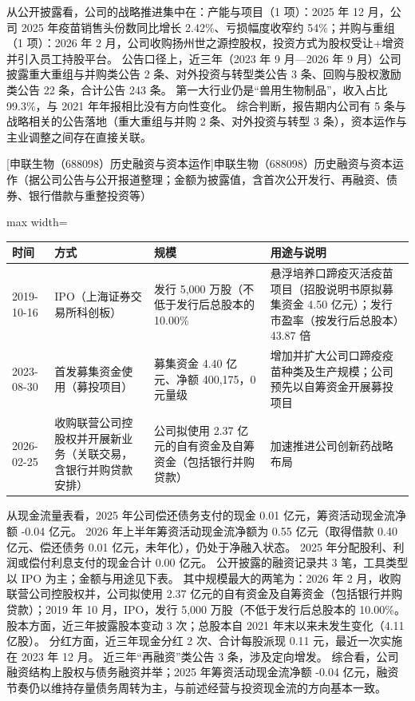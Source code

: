  从公开披露看，公司的战略推进集中在：产能与项目（1 项）：2025 年 12 月，公司 2025 年疫苗销售头份数同比增长 2.42\%、亏损幅度收窄约 54\%；并购与重组（1 项）：2026 年 2 月，公司收购扬州世之源控股权，投资方式为股权受让+增资并引入员工持股平台。 公告口径上，近三年（2023 年 9 月---2026 年 9 月）公司披露重大重组与并购类公告 2 条、对外投资与转型类公告 3 条、回购与股权激励类公告 22 条，合计公告 243 条。 第一大行业仍是“兽用生物制品”，收入占比 99.3\%，与 2021 年年报相比没有方向性变化。 综合判断，报告期内公司有 5 条与战略相关的公告落地（重大重组与并购 2 条、对外投资与转型 3 条），资本运作与主业调整之间存在直接关联。

\begin{center}\small\setlength{\tabcolsep}{4pt}
[申联生物（688098）历史融资与资本运作]{申联生物（688098）历史融资与资本运作（据公司公告与公开报道整理；金额为披露值，含首次公开发行、再融资、债券、银行借款与重整投资等）}
\begin{adjustbox}{max width=\textwidth}
\begin{tabular}{@{}p{1.45cm}p{2.55cm}p{4.05cm}p{4.95cm}@{}}
\toprule
时间 & 方式 & 规模 & 用途与说明 \\
\midrule
2019-10-16 & IPO（上海证券交易所科创板） & 发行 5,\allowbreak{}000 万股（不低于发行后总股本的 10.00\% & 悬浮培养口蹄疫灭活疫苗项目（招股说明书原拟募集资金 4.50 亿元）；发行市盈率（按发行后总股本）43.87 倍 \\
2023-08-30 & 首发募集资金使用（募投项目） & 募集资金 4.40 亿元、\allowbreak{}净额 400,\allowbreak{}175，\allowbreak{}0 元量级 & 增加并扩大公司口蹄疫疫苗种类及生产规模；公司预先以自筹资金开展募投项目 \\
2026-02-25 & 收购联营公司控股权并开展新业务（关联交易，含银行并购贷款安排） & 公司拟使用 2.37 亿元的自有资金及自筹资金（包括银行并购贷款） & 加速推进公司创新药战略布局 \\
\bottomrule
\end{tabular}
\end{adjustbox}
\end{center}

 从现金流量表看，2025 年公司偿还债务支付的现金 0.01 亿元，筹资活动现金流净额 -0.04 亿元。 2026 年上半年筹资活动现金流净额为 0.55 亿元（取得借款 0.40 亿元、偿还债务 0.01 亿元，未年化），仍处于净融入状态。 2025 年分配股利、利润或偿付利息支付的现金合计 0.00 亿元。 公开披露的融资记录共 3 笔，工具类型以 IPO 为主；金额与用途见下表。 其中规模最大的两笔为：2026 年 2 月，收购联营公司控股权并，公司拟使用 2.37 亿元的自有资金及自筹资金（包括银行并购贷款）；2019 年 10 月，IPO，发行 5,000 万股（不低于发行后总股本的 10.00\%。 股本方面，近三年披露股本变动 3 次；总股本自 2021 年末以来未发生变化（4.11 亿股）。 分红方面，近三年现金分红 2 次、合计每股派现 0.11 元，最近一次实施在 2023 年 12 月。 近三年“再融资”类公告 3 条，涉及定向增发。 综合看，公司融资结构上股权与债务融资并举；2025 年筹资活动现金流净额 -0.04 亿元，融资节奏仍以维持存量债务周转为主，与前述经营与投资现金流的方向基本一致。

